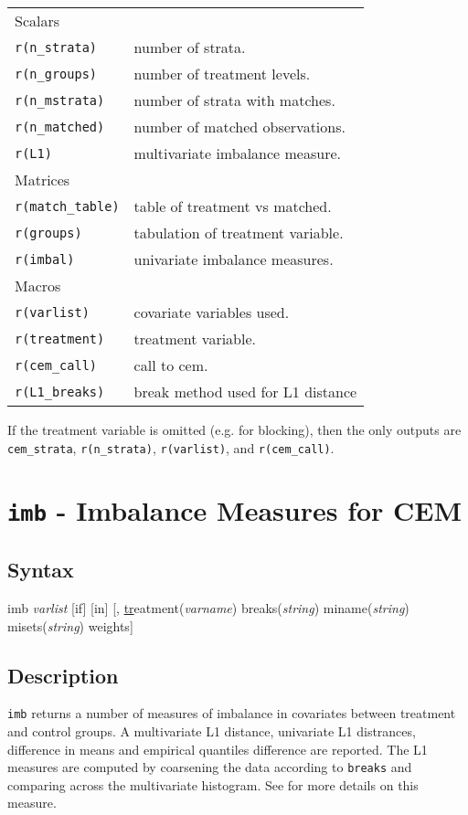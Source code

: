 \documentclass[11pt,titlepage]{article}
\begin{document}
\begin{tabular}{ll}
Scalars &\\
\texttt{r(n\_strata)} & number of strata. \\
\texttt{r(n\_groups)} & number of treatment levels.\\
\texttt{r(n\_mstrata)} & number of strata with matches.\\
\texttt{r(n\_matched)} &  number of matched observations.\\
\texttt{r(L1)} &  multivariate imbalance measure. \\
Matrices&\\
\texttt{r(match\_table)} & table of treatment vs matched.\\
\texttt{r(groups)}&  tabulation of treatment variable.\\
\texttt{r(imbal)} &  univariate imbalance measures.\\
Macros&\\
\texttt{r(varlist)} & covariate variables used.\\
\texttt{r(treatment)} & treatment variable.\\
\texttt{r(cem\_call)} & call to cem. \\
\texttt{r(L1\_breaks)} &break method used for L1 distance
\end{tabular}

If the treatment variable is omitted (e.g. for blocking), then the only outputs
are \texttt{cem\_strata}, \texttt{r(n\_strata)}, \texttt{r(varlist)}, and
\texttt{r(cem\_call)}.

\section{\texttt{imb} - Imbalance Measures for CEM}

\subsection{Syntax}
imb {\it varlist} [if] [in] [, \underline{tr}eatment({\it varname})
  breaks({\it string}) miname({\it string}) misets({\it string}) weights]
\subsection{Description}

\texttt{imb} returns a number of measures of imbalance in covariates
between treatment and control groups. A multivariate L1 distance,
univariate L1 distrances, difference in means and empirical quantiles
difference are reported. The L1 measures are computed by coarsening the
data according to \texttt{breaks} and comparing across the multivariate
histogram. See \cite{IacKinPor12} for more details on this measure.
 
\end{document}
